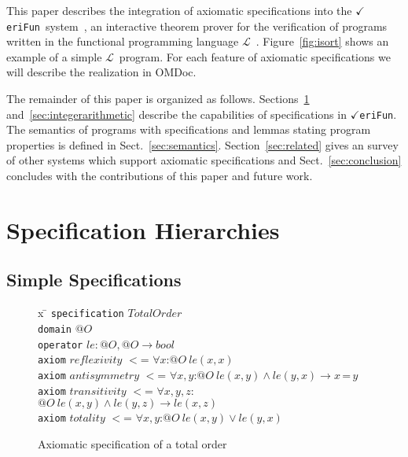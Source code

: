 \documentclass{article}
\theoremstyle{remark}
\theoremstyle{definition}
\newcommand{\VeriFun}{\mbox{{\Large $\checkmark $}\hspace{-0.21cm}\texttt{eriFun}}}
\newcommand{\vflang}{\ensuremath{\mathcal{L}}}
\newcommand{\ieq}{\,\texttt{=}\,}
\newcommand{\name}[1]{\mathit{#1}}
\begin{document}
This paper describes the integration of axiomatic specifications into the \VeriFun\
system~\cite{WS:VeriFun,WS:Classroom,VeriFun:Web}, an interactive theorem prover for the verification of programs
written in the functional programming language \vflang~\cite{ASW:LPrimer}. Figure~\ref{fig:isort} shows an example of a
simple \vflang\ program. For each feature of axiomatic specifications we will describe the realization in OMDoc.

The remainder of this paper is organized as follows. Sections~\ref{sec:capabilities} and~\ref{sec:integerarithmetic}
describe the capabilities of specifications in \VeriFun. The semantics of programs with specifications and lemmas
stating program properties is defined in Sect.~\ref{sec:semantics}. Section~\ref{sec:related} gives an survey of other
systems which support axiomatic specifications and Sect.~\ref{sec:conclusion} concludes with the contributions of this
paper and future work.

\section{Specification Hierarchies} \label{sec:capabilities}

\subsection{Simple Specifications}

\begin{figure}[t]
\begin{tabbing}
x \= \kill
\texttt{specification} $\name{TotalOrder}$ \\
\> \texttt{domain} $@O$ \\
\> \texttt{operator} $\name{le} : @O,@O \rightarrow \name{bool}$ \\
\> \texttt{axiom} $\name{reflexivity}$ $<$= $\forall x$:$@O\ \name{le}(x,x)$ \\
\> \texttt{axiom} $\name{antisymmetry}$ $<$= $\forall x,y$:$@O\ \name{le}(x,y) \wedge \name{le}(y,x) \rightarrow x \ieq y$ \\
\> \texttt{axiom} $\name{transitivity}$ $<$= $\forall x,y,z$:$@O\ \name{le}(x,y) \wedge \name{le}(y,z) \rightarrow \name{le}(x,z)$ \\
\> \texttt{axiom} $\name{totality}$ $<$= $\forall x,y$:$@O\ \name{le}(x,y) \vee \name{le}(y,x)$
\end{tabbing}

\caption{Axiomatic specification of a total order} \label{fig:totalorder}
\end{figure}
\end{document}
